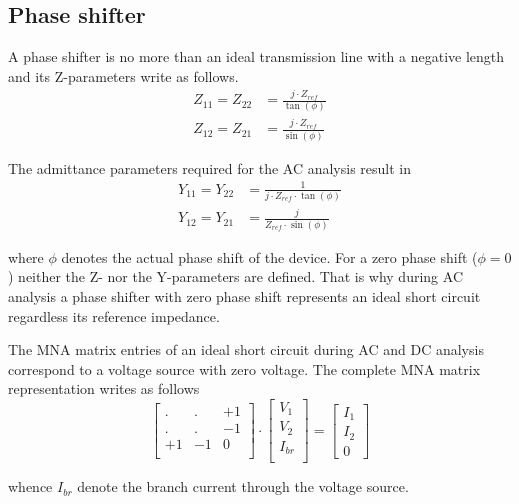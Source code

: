 \subsection{Phase shifter}

A phase shifter is no more than an ideal transmission line with a
negative length and its Z-parameters write as follows.
\begin{align}
Z_{11} = Z_{22} &= \frac{j\cdot Z_{ref}}{\tan(\phi)}\\
Z_{12} = Z_{21} &= \frac{j\cdot Z_{ref}}{\sin(\phi)}
\end{align}

The admittance parameters required for the AC analysis result in
\begin{align}
Y_{11} = Y_{22} &= \frac{1}{j\cdot Z_{ref} \cdot \tan{\left(\phi\right)}}\\
Y_{12} = Y_{21} &= \frac{j}{Z_{ref}\cdot \sin{\left(\phi\right)}}
\end{align}

where $\phi$ denotes the actual phase shift of the device.  For a zero
phase shift ($\phi = 0$) neither the Z- nor the Y-parameters are
defined.  That is why during AC analysis a phase shifter with zero
phase shift represents an ideal short circuit regardless its reference
impedance.

\addvspace{12pt}

The MNA matrix entries of an ideal short circuit during AC and DC
analysis correspond to a voltage source with zero voltage.  The
complete MNA matrix representation writes as follows
\begin{equation}
\begin{bmatrix}
. & . & +1\\
. & . & -1\\
+1 & -1 & 0\\
\end{bmatrix}
\cdot
\begin{bmatrix}
V_1\\
V_2\\
I_{br}\\
\end{bmatrix}
=
\begin{bmatrix}
I_1\\
I_2\\
0
\end{bmatrix}
\end{equation}

whence $I_{br}$ denote the branch current through the voltage source.

